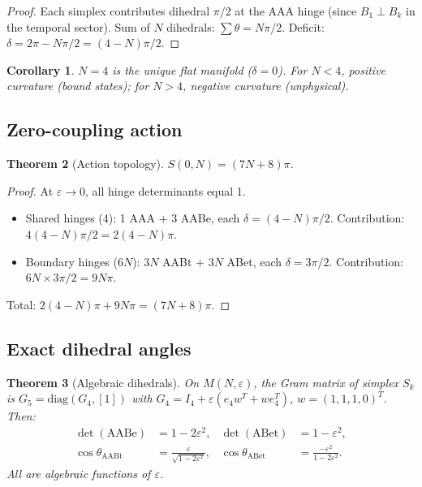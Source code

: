 \documentclass[12pt]{article}
\newtheorem{theorem}{Theorem}[section]
\newtheorem{corollary}[theorem]{Corollary}
\theoremstyle{definition}
\theoremstyle{remark}
\begin{document}
\begin{proof}
Each simplex contributes dihedral $\pi/2$ at the AAA hinge
(since $B_1 \perp B_k$ in the temporal sector). Sum of $N$ dihedrals:
$\sum \theta = N\pi/2$. Deficit: $\delta = 2\pi - N\pi/2 = (4-N)\pi/2$.
\end{proof}

\begin{corollary}
$N=4$ is the unique flat manifold ($\delta=0$). For $N<4$, positive
curvature (bound states); for $N>4$, negative curvature (unphysical).
\end{corollary}

\subsection{Zero-coupling action}

\begin{theorem}[Action topology]
\label{thm:action0}
$S(0,N) = (7N+8)\pi$.
\end{theorem}

\begin{proof}
At $\varepsilon \to 0$, all hinge determinants equal 1.
\begin{itemize}
\item Shared hinges (4): 1 AAA + 3 AABe, each $\delta = (4-N)\pi/2$.
  Contribution: $4(4-N)\pi/2 = 2(4-N)\pi$.
\item Boundary hinges ($6N$): $3N$ AABt + $3N$ ABet, each $\delta = 3\pi/2$.
  Contribution: $6N \times 3\pi/2 = 9N\pi$.
\end{itemize}
Total: $2(4-N)\pi + 9N\pi = (7N+8)\pi$.
\end{proof}

\subsection{Exact dihedral angles}

\begin{theorem}[Algebraic dihedrals]
\label{thm:dihedral}
On $M(N,\varepsilon)$, the Gram matrix of simplex $S_k$ is
$G_5 = \mathrm{diag}(G_4,[1])$ with $G_4 = I_4 + \varepsilon(e_4 w^T + w e_4^T)$,
$w=(1,1,1,0)^T$. Then:
\begin{align}
\det(\text{AABe}) &= 1-2\varepsilon^2, &
\det(\text{ABet}) &= 1-\varepsilon^2, \label{eq:dets} \\
\cos\theta_{\text{AABt}} &= \frac{\varepsilon}{\sqrt{1-2\varepsilon^2}}, &
\cos\theta_{\text{ABet}} &= \frac{-\varepsilon^2}{1-2\varepsilon^2}. \label{eq:cos}
\end{align}
All are algebraic functions of $\varepsilon$.
\end{theorem}
\end{document}
